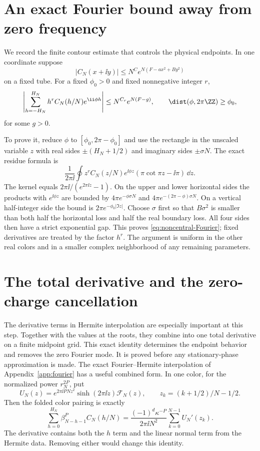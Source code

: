 \section{An exact Fourier bound away from zero frequency}
We record the finite contour estimate that controls the physical endpoints. In one coordinate suppose
\[
 |C_N(x+\ii y)|\le N^C e^{N(F-a x^2+B y^2)}
\]
on a fixed tube. For a fixed $\phi_0>0$ and fixed nonnegative integer $r$,
\begin{equation}\label{eq:noncentral-Fourier}
 \left|\sum_{h=-H_N}^{H_N}h^rC_N(h/N)e^{\ii\phi h}\right|
 \le N^{C_r}e^{N(F-g)},\qquad
 \dist(\phi,2\pi\ZZ)\ge\phi_0,
\end{equation}
for some $g>0$.

To prove it, reduce $\phi$ to $[\phi_0,2\pi-\phi_0]$ and use the rectangle in the unscaled variable $z$ with real sides $\pm(H_N+1/2)$ and imaginary sides $\pm\sigma N$. The exact residue formula is
\[
 \frac1{2\pi\ii}\oint z^r C_N(z/N)e^{\ii\phi z}
 (\pi\cot\pi z-\ii\pi)\,\dd z.
\]
The kernel equals $2\pi\ii/(e^{2\pi\ii z}-1)$. On the upper and lower horizontal sides the products with $e^{\ii\phi z}$ are bounded by $4\pi e^{-\phi\sigma N}$ and $4\pi e^{-(2\pi-\phi)\sigma N}$. On a vertical half-integer side the bound is $2\pi e^{-\phi_0|\Im z|}$. Choose $\sigma$ first so that $B\sigma^2$ is smaller than both half the horizontal loss and half the real boundary loss. All four sides then have a strict exponential gap. This proves \eqref{eq:noncentral-Fourier}; fixed derivatives are treated by the factor $h^r$. The argument is uniform in the other real colors and in a smaller complex neighborhood of any remaining parameters.

\section{The total derivative and the zero-charge cancellation}

The derivative terms in Hermite interpolation are especially important at this step. Together with the values at the roots, they combine into one total derivative on a finite midpoint grid. This exact identity determines the endpoint behavior and removes the zero Fourier mode. It is proved before any stationary-phase approximation is made.
The exact Fourier--Hermite interpolation of Appendix~\ref{app:fourier} has a useful combined form. In one color, for the normalized power $r_N^{2P}$, put
\[
 U_N(z)=e^{2\pi\ii PNz^2}\sinh(2\pi\ii z)\mathcal F_N(z),\qquad
 z_k=(k+1/2)/N-1/2.
\]
Then the folded color pairing is exactly
\begin{equation}\label{eq:sampled-derivative}
 \sum_{h=0}^{H_N}\beta_{N-h-1}^{P}C_N(h/N)
 =\frac{(-1)^d\kappa^{-P}}{2\pi\ii N^2}
 \sum_{k=0}^{N-1}U_N'(z_k).
\end{equation}
The derivative contains both the $h$ term and the linear normal term from the Hermite data. Removing either would change this identity.

